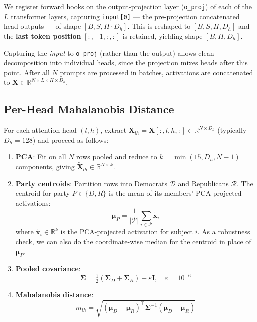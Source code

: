 We register forward hooks on the output-projection layer (\texttt{o\_proj}) of each of the $L$ transformer layers, capturing \texttt{input[0]} — the pre-projection concatenated head outputs — of shape $[B, S, H{\cdot}D_h]$. This is reshaped to $[B, S, H, D_h]$ and the \textbf{last token position} $[:,{-1},:,:]$ is retained, yielding shape $[B, H, D_h]$.

Capturing the \emph{input} to \texttt{o\_proj} (rather than the output) allows clean decomposition into individual heads, since the projection mixes heads after this point. After all $N$ prompts are processed in batches, activations are concatenated to $\mathbf{X} \in \mathbb{R}^{N \times L \times H \times D_h}$.

\subsection{Per-Head Mahalanobis Distance}
\label{sec:mahal}

For each attention head $(l, h)$, extract $\mathbf{X}_{lh} = \mathbf{X}[:, l, h, :] \in \mathbb{R}^{N \times D_h}$ (typically $D_h = 128$) and proceed as follows:

\begin{enumerate}[label=\arabic*.]
    \item \textbf{PCA}: Fit on all $N$ rows pooled and reduce to $k = \min(15, D_h, N{-}1)$ components, giving $\tilde{\mathbf{X}}_{lh} \in \mathbb{R}^{N \times k}$.

    \item \textbf{Party centroids}: Partition rows into Democrats $\mathcal{D}$ and Republicans $\mathcal{R}$. The centroid for party $P \in \{D, R\}$ is the mean of its members' PCA-projected activations:
    \begin{equation}
        \boldsymbol{\mu}_P = \frac{1}{|\mathcal{P}|}\sum_{i \in \mathcal{P}} \tilde{\mathbf{x}}_i
        \label{eq:centroid}
    \end{equation}
    where $\tilde{\mathbf{x}}_i \in \mathbb{R}^k$ is the PCA-projected activation for subject $i$. As a robustness check, we can also do the coordinate-wise median for the centroid in place of $\boldsymbol{\mu}_P$.

    \item \textbf{Pooled covariance}:
    \begin{equation}
        \boldsymbol{\Sigma} = \tfrac{1}{2}(\boldsymbol{\Sigma}_D + \boldsymbol{\Sigma}_R) + \varepsilon\mathbf{I}, \quad \varepsilon = 10^{-6}
    \end{equation}

    \item \textbf{Mahalanobis distance}:
    \begin{equation}
        m_{lh} = \sqrt{(\boldsymbol{\mu}_D - \boldsymbol{\mu}_R)^\top \boldsymbol{\Sigma}^{-1} (\boldsymbol{\mu}_D - \boldsymbol{\mu}_R)}
        \label{eq:mahal}
    \end{equation}
\end{enumerate}

